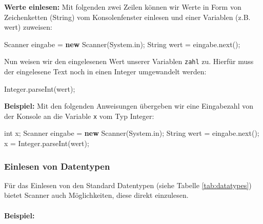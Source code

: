 \documentclass[10pt,paper=17cm:22cm, twoside=true, DIV=14]{scrbook}
\newenvironment {Shaded}
        {\begin{mdframed}[style=code] }
         {\end{mdframed}}
\newcommand{\KeywordTok}[1]{\textcolor[rgb]{0.00,0.44,0.13}{\textbf{{#1}}}}
\newcommand{\DataTypeTok}[1]{\textcolor[rgb]{0.56,0.13,0.00}{{#1}}}
\newcommand{\FunctionTok}[1]{\textcolor[rgb]{0.02,0.16,0.49}{{#1}}}
\newcommand{\NormalTok}[1]{{#1}}
\begin{document}
\textbf{Werte einlesen:} Mit folgenden zwei Zeilen können wir Werte in
Form von Zeichenketten (String) vom Konsolenfenster einlesen und einer
Variablen (z.B. wert) zuweisen:

\begin{Shaded}
\begin{Highlighting}[]
\NormalTok{Scanner eingabe = }\KeywordTok{new} \NormalTok{Scanner(System.}\FunctionTok{in}\NormalTok{);}
\NormalTok{String wert = eingabe.}\FunctionTok{next}\NormalTok{();}
\end{Highlighting}
\end{Shaded}

Nun weisen wir den eingelesenen Wert unserer Variablen \texttt{zahl} zu.
Hierfür muss der eingelesene Text noch in einen Integer umgewandelt
werden:

\begin{Shaded}
\begin{Highlighting}[]
\NormalTok{Integer.}\FunctionTok{parseInt}\NormalTok{(wert);}
\end{Highlighting}
\end{Shaded}

\textbf{Beispiel:} Mit den folgenden Anweisungen übergeben wir eine
Eingabezahl von der Konsole an die Variable \texttt{x} vom Typ Integer:

\begin{Shaded}
\begin{Highlighting}[]
\DataTypeTok{int} \NormalTok{x;}
\NormalTok{Scanner eingabe = }\KeywordTok{new} \NormalTok{Scanner(System.}\FunctionTok{in}\NormalTok{);}
\NormalTok{String wert = eingabe.}\FunctionTok{next}\NormalTok{();}
\NormalTok{x = Integer.}\FunctionTok{parseInt}\NormalTok{(wert);}
\end{Highlighting}
\end{Shaded}

\subsubsection{Einlesen von Datentypen}\label{einlesen-von-datentypen}

Für das Einlesen von den Standard Datentypen (siehe Tabelle
\ref{tab:datatypes}) bietet Scanner auch Möglichkeiten, diese direkt
einzulesen.

\paragraph{Beispiel:}\label{beispiel-9}
\end{document}
